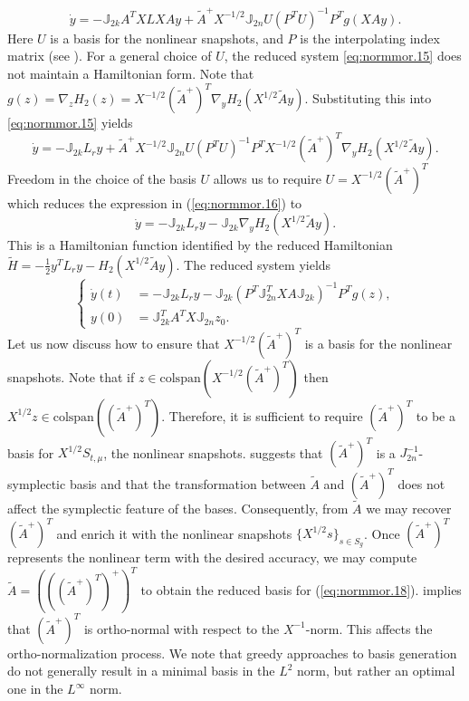 {\begin{equation} \label{eq:normmor.15}
	\dot y = -\mathbb J_{2k} A^TXLXAy + \tilde A^+ X^{-1/2} \mathbb J_{2n} U (P^TU)^{-1} P^T g(XAy).
\end{equation}
Here $U$ is a basis for the nonlinear snapshots, and $P$ is the interpolating index matrix (see ). For a general choice of $U$, the reduced system \eqref{eq:normmor.15} does not maintain a Hamiltonian form. Note that $g(z) = \nabla_z H_2(z) = X^{-1/2}(\tilde A^+)^T \nabla_y H_2 ( X^{1/2} \tilde A y  )$. Substituting this into \eqref{eq:normmor.15} yields
\begin{equation} \label{eq:normmor.16}
	\dot y = -\mathbb J_{2k} L_ry + \tilde A^+ X^{-1/2} \mathbb J_{2n} U (P^TU)^{-1} P^T X^{-1/2}(\tilde A^+)^T \nabla_y H_2 ( X^{1/2} \tilde A y  ).
\end{equation}
Freedom in the choice of the basis $U$ allows us to require $U = X^{-1/2} (\tilde A^+)^T$ which reduces the expression in (\ref{eq:normmor.16}) to
\begin{equation} \label{eq:normmor.17}
	\dot y = - \mathbb J_{2k} L_ry - \mathbb J_{2k} \nabla_y H_2 ( X^{1/2} \tilde A y  ).
\end{equation}
This is a Hamiltonian function identified by the reduced Hamiltonian $\tilde H = -\frac 1 2 y^T L_r y - H_2(X^{1/2} \tilde A y)$. The reduced system yields
\begin{equation} \label{eq:normmor.18}
\left\{
\begin{aligned}
	\dot y(t) &= - \mathbb J_{2k} L_ry - \mathbb J_{2k} ( P^T \mathbb J_{2n}^T XA \mathbb J_{2k}  )^{-1} P^T g(z), \\
	y(0) &= \mathbb J_{2k}^T A^T X \mathbb J_{2n} z_0.
\end{aligned}
\right.
\end{equation}
}
Let us now discuss how to ensure that $X^{-1/2} (\tilde A^+)^T$ is a basis for the nonlinear snapshots. Note that if $z \in \text{colspan}\left(X^{-1/2} (\tilde A^+)^T\right)$ then $X^{1/2} z \in \text{colspan}\left(( \tilde A^+)^T \right)$. Therefore, it is sufficient to require $(\tilde A^+)^T$ to be a basis for $X^{1/2}S_{t,\mu}$, the nonlinear snapshots.  suggests that $(\tilde A^+)^T$ is a $J_{2n}^{-1}$-symplectic basis and that the transformation between $\tilde A$ and $(\tilde A^+)^T $ does not affect the symplectic feature of the bases. Consequently, from $\tilde A$ we may recover $(\tilde A^+)^T$ and enrich it with the nonlinear snapshots $\{ X^{1/2} s \}_{s\in S_{g}}$. Once $(\tilde A^+)^T$ represents the nonlinear term with the desired accuracy, we may compute $\tilde A= \left( \left( ( \tilde A^+ )^T \right)^+ \right)^T$ to obtain the reduced basis for (\ref{eq:normmor.18}).  implies that $(\tilde A^+)^T$ is ortho-normal with respect to the $X^{-1}$-norm. This affects the ortho-normalization process. We note that greedy approaches to basis generation do not generally result in a minimal basis in the $L^{2}$ norm, but rather an optimal one in the $L^{\infty}$ norm.

